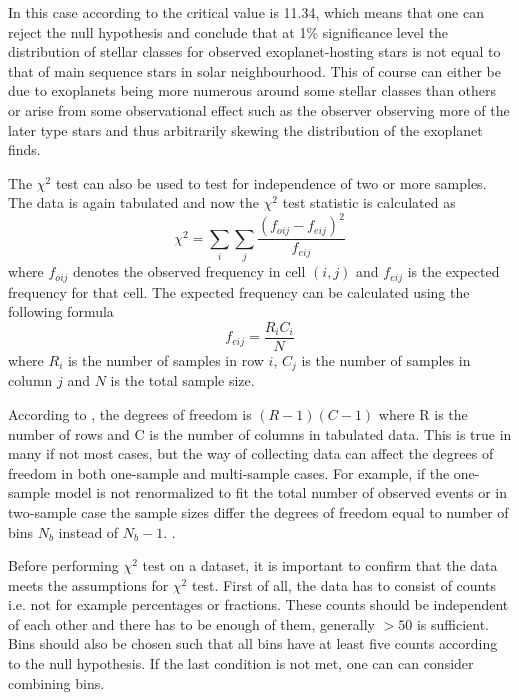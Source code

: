 \documentclass[english, oneside]{HYgradu}
\begin{document}
In this case according to \citet{corder2014nonparametric} the critical value is 11.34, which means that one can reject the null hypothesis and conclude that at 1\% significance level the distribution of stellar classes for observed exoplanet-hosting stars is not equal to that of main sequence stars in solar neighbourhood. This of course can either be due to exoplanets being more numerous around some stellar classes than others or arise from some observational effect such as the observer observing more of the later type stars and thus arbitrarily skewing the distribution of the exoplanet finds.

The $\chi^2$ test can also be used to test for independence of two or more samples. The data is again tabulated and now the $\chi^2$ test statistic is calculated as
\begin{equation}
	\chi^2 = \sum_i \sum_j \frac{(f_{oij}-f_{eij})^2}{f_{eij}}
\end{equation}
where $f_{oij}$ denotes the observed frequency in cell $(i, j)$ and $f_{eij}$ is the expected frequency for that cell. The expected frequency can be calculated using the following formula
\begin{equation}
	f_{eij} = \frac{R_i C_i}{N}
\end{equation}
where $R_i$ is the number of samples in row $i$, $C_j$ is the number of samples in column $j$ and $N$ is the total sample size. \citep{corder2014nonparametric}

According to \citet{corder2014nonparametric}, the degrees of freedom is $(R-1)(C-1)$ where R is the number of rows and C is the number of columns in tabulated data. This is true in many if not most cases, but the way of collecting data can affect the degrees of freedom in both one-sample and multi-sample cases. For example, if the one-sample model is not renormalized to fit the total number of observed events or in two-sample case the sample sizes differ the degrees of freedom equal to number of bins $N_b$ instead of $N_b-1$. \citep{press2007numerical}.

Before performing $\chi^2$ test on a dataset, it is important to confirm that the data meets the assumptions for $\chi^2$ test. First of all, the data has to consist of counts i.e. not for example percentages or fractions. These counts should be independent of each other and there has to be enough of them, generally $>50$ is sufficient. Bins should also be chosen such that all bins have at least five counts according to the null hypothesis. If the last condition is not met, one can can consider combining bins. \citep{bock2010stats, htk}
\end{document}
